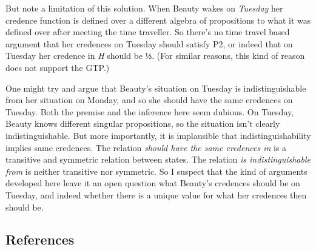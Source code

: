 \documentclass[
  10pt,
  letterpaper,
  DIV=11,
  numbers=noendperiod,
  twoside]{scrartcl}
\begin{document}
But note a limitation of this solution. When Beauty wakes on
\emph{Tuesday} her credence function is defined over a different algebra
of propositions to what it was defined over after meeting the time
traveller. So there's no time travel based argument that her credences
on Tuesday should satisfy P2, or indeed that on Tuesday her credence in
\emph{H} should be ⅓. (For similar reasons, this kind of reason does not
support the GTP.)

One might try and argue that Beauty's situation on Tuesday is
indistinguishable from her situation on Monday, and so she should have
the same credences on Tuesday. Both the premise and the inference here
seem dubious. On Tuesday, Beauty knows different singular propositions,
so the situation isn't clearly indistinguishable. But more importantly,
it is implausible that indistinguishability implies same credences. The
relation \emph{should have the same credences in} is a transitive and
symmetric relation between states. The relation \emph{is
indistinguishable from} is neither transitive nor symmetric. So I
suspect that the kind of arguments developed here leave it an open
question what Beauty's credences should be on Tuesday, and indeed
whether there is a unique value for what her credences then should be.

\subsection*{References}\label{references}
\end{document}
